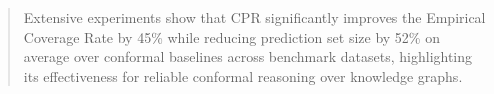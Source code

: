 \documentclass{article}
\theoremstyle{plain}
\theoremstyle{definition}
\theoremstyle{remark}
\begin{document}
\begin{abstract}
Extensive experiments show that CPR significantly improves the Empirical Coverage Rate by 45\% while reducing  prediction set size by 52\% on average over conformal baselines across benchmark datasets, highlighting its effectiveness for reliable conformal reasoning over knowledge graphs. 

\end{abstract}


\end{document}
